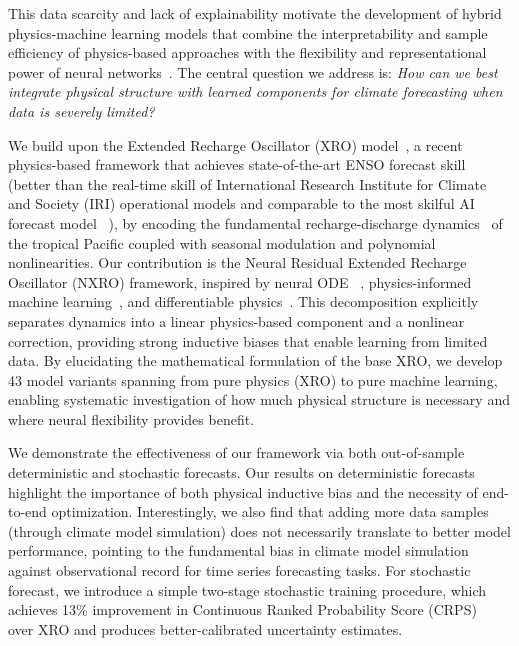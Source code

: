 This data scarcity and lack of explainability motivate the development of hybrid physics-machine learning models that combine the interpretability and sample efficiency of physics-based approaches with the flexibility and representational power of neural networks~\cite{willard2023integrating,yin2021augmenting}. The central question we address is: \emph{How can we best integrate physical structure with learned components for climate forecasting when data is severely limited?}

We build upon the Extended Recharge Oscillator (XRO) model~\cite{zhao2024xro}, a recent physics-based framework that achieves state-of-the-art ENSO forecast skill (better than the real-time skill of International Research Institute for Climate and Society (IRI) operational models 
and comparable to the most skilful AI forecast model ~\cite{ZhouZhang2023GeoformerENSO,Ham2019DeepLearningENSO}), 
by encoding the fundamental recharge-discharge dynamics~\cite{jin1997equatorial} of the tropical Pacific coupled with seasonal modulation and polynomial nonlinearities. Our contribution is the Neural Residual Extended Recharge Oscillator (NXRO) framework, inspired by neural ODE ~\cite{chen2018neuralode,rubanova2019latent}, physics-informed machine learning~\cite{karniadakis2021physics}, and differentiable physics~\cite{um2020solver,list2022learned}. This decomposition explicitly separates dynamics into a linear physics-based component and a nonlinear correction, providing strong inductive biases that enable learning from limited data. By elucidating the mathematical formulation of the base XRO, we develop 43 model variants spanning from pure physics (XRO) to pure machine learning, enabling systematic investigation of how much physical structure is necessary and where neural flexibility provides benefit.

We demonstrate the effectiveness of our framework via both out-of-sample deterministic and stochastic forecasts. Our results on deterministic forecasts highlight the importance of both physical inductive bias and the necessity of end-to-end optimization. Interestingly, we also find that adding more data samples (through climate model simulation) does not necessarily translate to better model performance, pointing to the fundamental bias in climate model simulation against observational record for time series forecasting tasks. For stochastic forecast, we introduce a simple two-stage stochastic training procedure, which achieves 13\% improvement in Continuous Ranked Probability Score (CRPS)~\cite{hersbach2000,gneiting2007} over XRO and produces better-calibrated uncertainty estimates. 